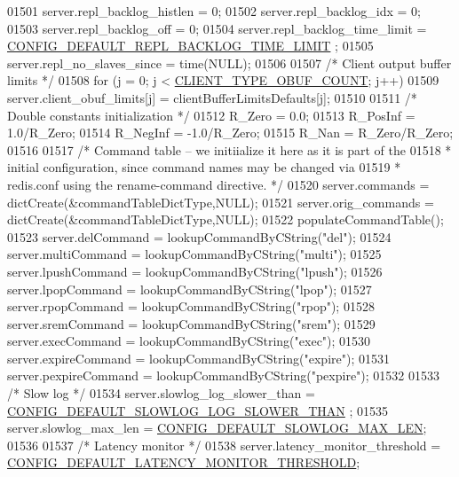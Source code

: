 \begin{DoxyCode}
{{{{{{{{{{{{{{{01501     server.repl\_backlog\_histlen = 0;
01502     server.repl\_backlog\_idx = 0;
01503     server.repl\_backlog\_off = 0;
01504     server.repl\_backlog\_time\_limit = \hyperlink{server_8h_ac5c5c62f45277671484daad919338b5e}{CONFIG\_DEFAULT\_REPL\_BACKLOG\_TIME\_LIMIT}
      ;
01505     server.repl\_no\_slaves\_since = time(NULL);
01506 
01507     \textcolor{comment}{/* Client output buffer limits */}
01508     \textcolor{keywordflow}{for} (j = 0; j < \hyperlink{server_8h_aea8f6f3fac3a68e35807eba109dbc501}{CLIENT\_TYPE\_OBUF\_COUNT}; j++)
01509         server.client\_obuf\_limits[j] = clientBufferLimitsDefaults[j];
01510 
01511     \textcolor{comment}{/* Double constants initialization */}
01512     R\_Zero = 0.0;
01513     R\_PosInf = 1.0/R\_Zero;
01514     R\_NegInf = -1.0/R\_Zero;
01515     R\_Nan = R\_Zero/R\_Zero;
01516 
01517     \textcolor{comment}{/* Command table -- we initiialize it here as it is part of the}
01518 \textcolor{comment}{     * initial configuration, since command names may be changed via}
01519 \textcolor{comment}{     * redis.conf using the rename-command directive. */}
01520     server.commands = dictCreate(&commandTableDictType,NULL);
01521     server.orig\_commands = dictCreate(&commandTableDictType,NULL);
01522     populateCommandTable();
01523     server.delCommand = lookupCommandByCString(\textcolor{stringliteral}{"del"});
01524     server.multiCommand = lookupCommandByCString(\textcolor{stringliteral}{"multi"});
01525     server.lpushCommand = lookupCommandByCString(\textcolor{stringliteral}{"lpush"});
01526     server.lpopCommand = lookupCommandByCString(\textcolor{stringliteral}{"lpop"});
01527     server.rpopCommand = lookupCommandByCString(\textcolor{stringliteral}{"rpop"});
01528     server.sremCommand = lookupCommandByCString(\textcolor{stringliteral}{"srem"});
01529     server.execCommand = lookupCommandByCString(\textcolor{stringliteral}{"exec"});
01530     server.expireCommand = lookupCommandByCString(\textcolor{stringliteral}{"expire"});
01531     server.pexpireCommand = lookupCommandByCString(\textcolor{stringliteral}{"pexpire"});
01532 
01533     \textcolor{comment}{/* Slow log */}
01534     server.slowlog\_log\_slower\_than = \hyperlink{server_8h_a3cf317db9aeeba99be3654b11d3d0580}{CONFIG\_DEFAULT\_SLOWLOG\_LOG\_SLOWER\_THAN}
      ;
01535     server.slowlog\_max\_len = \hyperlink{server_8h_ada65a939812527070ed001e451d9bc54}{CONFIG\_DEFAULT\_SLOWLOG\_MAX\_LEN};
01536 
01537     \textcolor{comment}{/* Latency monitor */}
01538     server.latency\_monitor\_threshold = 
      \hyperlink{server_8h_a20a7f934b2eceae8fdbb1ac112a783c3}{CONFIG\_DEFAULT\_LATENCY\_MONITOR\_THRESHOLD};
}}}}}}}}}}}}}}}
\end{DoxyCode}
